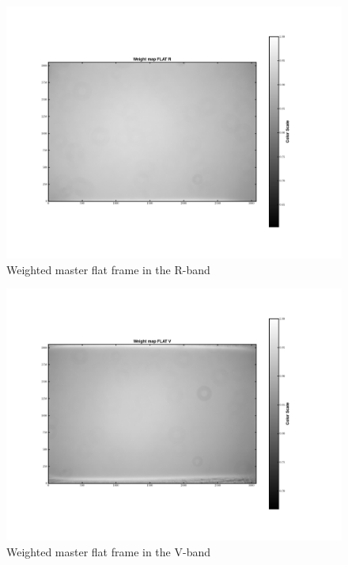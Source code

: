 \documentclass[12pt]{article}
\begin{document}
    \begin{figure}[H]
    \centering
    \includegraphics[width=\textwidth]{fig/weightmap_FLAT_R.png}
    \caption{ Weighted master flat frame in the R-band}

    \end{figure}

    \begin{figure}[H]
    \centering
    \includegraphics[width=\textwidth]{fig/weightmap_FLAT_V.png}
    \caption{ Weighted master flat frame in the V-band}

    \end{figure}
\end{document}
